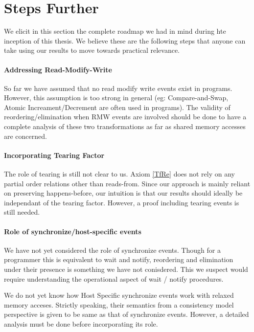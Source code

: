 \section{Steps Further}

    We elicit in this section the complete roadmap we had in mind during hte inception of this thesis. 
    We believe these are the following steps that anyone can take using our results to move towards practical relevance.

    \paragraph{Addressing Read-Modify-Write}
        So far we have assumed that no read modify write events exist in programs.
        However, this assumption is too strong in general (eg: Compare-and-Swap, Atomic Increament/Decrement are often used in programs).
        The validity of reordering/elimination when RMW events are involved should be done to have a complete analysis of these two transformations as far as shared memory accesses are concerned.

    \paragraph{Incorporating Tearing Factor}
        The role of tearing is still not clear to us.
        Axiom \ref{TfRe} does not rely on any partial order relations other than reads-from. 
        Since our approach is mainly reliant on preserving happens-before, our intuition is that our results should ideally be independant of the tearing factor.
        However, a proof including tearing events is still needed.   
  
    \paragraph{Role of synchronize/host-specific events}
        We have not yet considered the role of synchronize events. 
        Though for a programmer this is equivalent to wait and notify, reordering and elimination under their presence is something we have not conisdered. 
        This we suspect would require understanding the operational aspect of wait / notify procedures.

        We do not yet know how Host Specific synchronize events work with relaxed memory acceses.
        Strictly speaking, their semantics from a consistency model perspective is given to be same as that of synchronize events. 
        However, a detailed analysis must be done before incorporating its role. 
    
